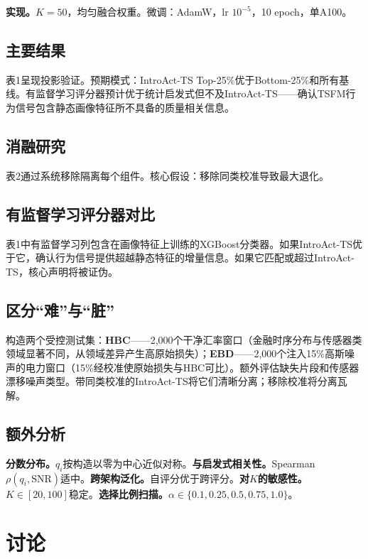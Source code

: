 \documentclass{article}
\begin{document}
\textbf{实现。}$K = 50$，均匀融合权重。微调：AdamW，lr $10^{-5}$，10 epoch，单A100。

\subsection{主要结果}

表1呈现投影验证。预期模式：IntroAct-TS Top-25\%优于Bottom-25\%和所有基线。有监督学习评分器预计优于统计启发式但不及IntroAct-TS——确认TSFM行为信号包含静态画像特征所不具备的质量相关信息。

\subsection{消融研究}

表2通过系统移除隔离每个组件。核心假设：移除同类校准导致最大退化。

\subsection{有监督学习评分器对比}
\label{sec:learned_baseline}

表1中有监督学习列包含在画像特征上训练的XGBoost分类器。如果IntroAct-TS优于它，确认行为信号提供超越静态特征的增量信息。如果它匹配或超过IntroAct-TS，核心声明将被证伪。

\subsection{区分“难”与“脏”}

构造两个受控测试集：\textbf{HBC}——2,000个干净汇率窗口（金融时序分布与传感器类领域显著不同，从领域差异产生高原始损失）；\textbf{EBD}——2,000个注入15\%高斯噪声的电力窗口（15\%经校准使原始损失与HBC可比）。额外评估缺失片段和传感器漂移噪声类型。带同类校准的IntroAct-TS将它们清晰分离；移除校准将分离瓦解。

\subsection{额外分析}

\textbf{分数分布。}$q_i$按构造以零为中心近似对称。\textbf{与启发式相关性。}Spearman $\rho(q_i, \text{SNR})$适中。\textbf{跨架构泛化。}自评分优于跨评分。\textbf{对$K$的敏感性。}$K \in [20, 100]$稳定。\textbf{选择比例扫描。}$\alpha \in \{0.1, 0.25, 0.5, 0.75, 1.0\}$。

\section{讨论}
\end{document}
